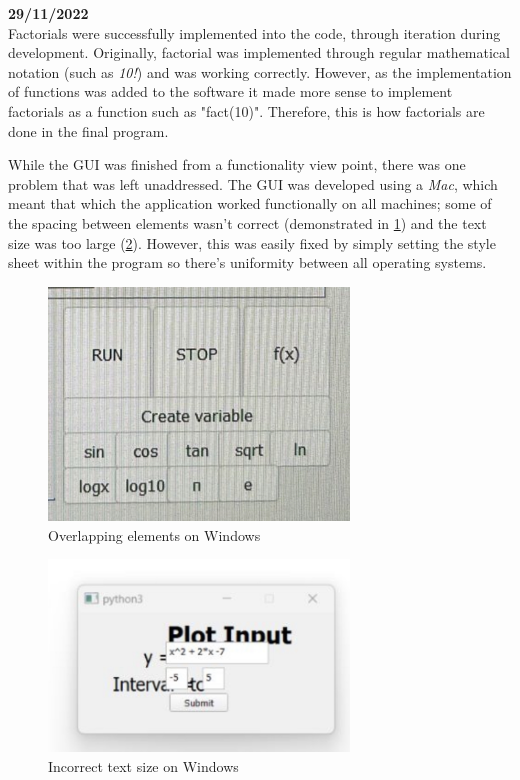 \documentclass[a4paper, oneside, 11pt]{report}
\begin{document}
\textbf{29/11/2022} \\

Factorials were successfully implemented into the code, through iteration during development. Originally, factorial was implemented through regular mathematical notation (such as \emph{10!}) and was working correctly. However, as the implementation of functions was added to the software it made more sense to implement factorials as a function such as "fact(10)". Therefore, this is how factorials are done in the final program. 

While the GUI was finished from a functionality view point, there was one problem that was left unaddressed. The GUI was developed using a \emph{Mac}, which meant that which the application worked functionally on all machines; some of the spacing between elements wasn't correct (demonstrated in \ref{fig:overlap}) and the text size was too large (\ref{fig:textsize}). However, this was easily fixed by simply setting the style sheet within the program so there's uniformity between all operating systems. 

\begin{figure}[H]
    \centering
    \includegraphics[width=8cm]{development_issues1.jpg}
    \caption{Overlapping elements on Windows}
    \label{fig:overlap}
\end{figure}

\begin{figure}[H]
    \centering
    \includegraphics[width=8cm]{development_issues2.jpg}
    \caption{Incorrect text size on Windows}
    \label{fig:textsize}
\end{figure}
\end{document}
